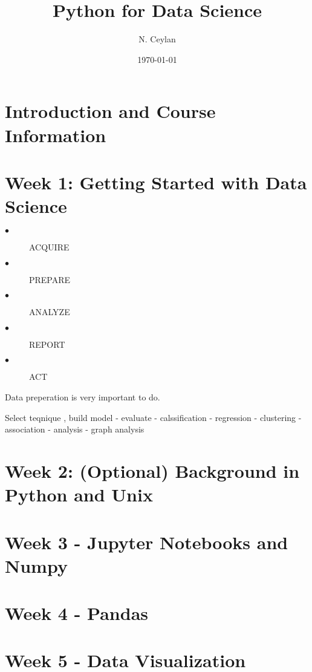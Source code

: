 \documentclass[letterpaper,12pt]{article}
\begin{document}
\title{Python for Data Science}
\author{N. Ceylan}
\date{\today}
\maketitle


\section{Introduction and Course Information}

\section{Week 1: Getting Started with Data Science}


\begin{description}
	\item[$\bullet$] ACQUIRE
	\item[$\bullet$] PREPARE
		\item[$\bullet$] ANALYZE
			\item[$\bullet$] REPORT
				\item[$\bullet$] ACT
    
    
\end{description}

Data preperation is very important to do.

Select teqnique , build model - evaluate - calssification - regression - clustering - association - analysis - graph analysis

\section{Week 2: (Optional) Background in Python and Unix}







\section{Week 3 - Jupyter Notebooks and Numpy}






\section{Week 4 - Pandas}




\section{Week 5 - Data Visualization
}
\end{document}
